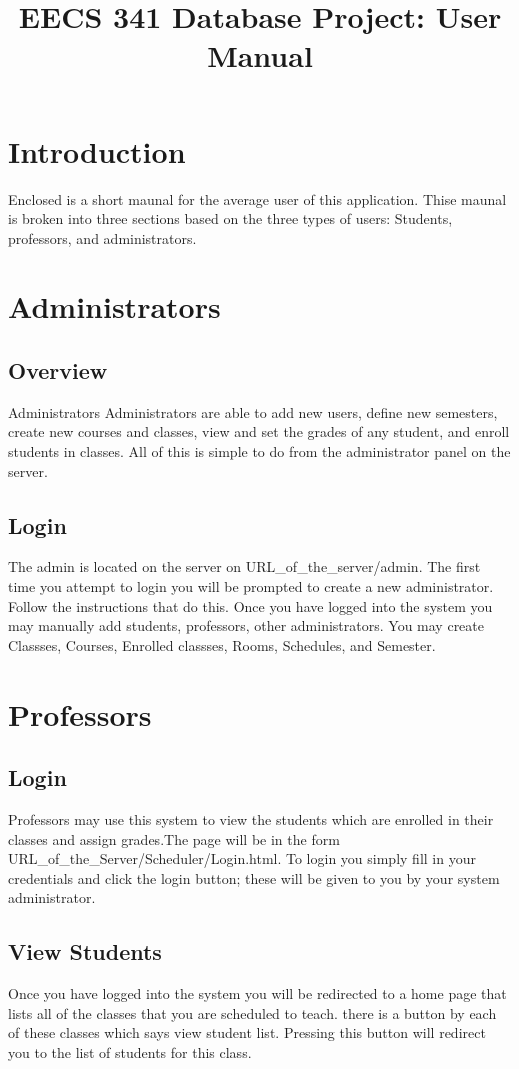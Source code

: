 \documentclass[11pt,oneside,a4paper]{article}
\title{EECS 341 Database Project: User Manual}
\begin{document}
\maketitle
\section{Introduction}
Enclosed is a short maunal for the average user of this application.  
Thise maunal is broken into three sections based on the three types of 
users: Students, professors, and administrators.
\section{Administrators}
\subsection{Overview}
Administrators Administrators are able to add new users, define new semesters, create new
courses and classes, view and set the grades of any student, and enroll students in
classes.  All of this is simple to do from the administrator panel on the server.  
\subsection{Login}
The admin is located on the server on URL_of_the_server/admin. The first time you attempt
to login you will be prompted to create a new administrator.  Follow the instructions that 
do this.  Once you have logged into the system you may manually add students, professors, 
other administrators.  You may create Classses, Courses, Enrolled classses, Rooms, 
Schedules, and Semester.
\section{Professors}
\subsection{Login}
Professors may use this system to view the students which are enrolled 
in their classes and assign grades.The page will be in the form URL_of_the_Server/Scheduler/Login.html. 
 To login you simply fill in your credentials and click the login button; these will be 
given to you by your system administrator.  
\subsection{View Students}
Once you have logged into the system you will be redirected to a home page that lists all 
of the classes that you are scheduled to teach. there is a button by each of these classes
 which says view student list.  Pressing this button will redirect you to the list of 
students for this class.
\end{document}
